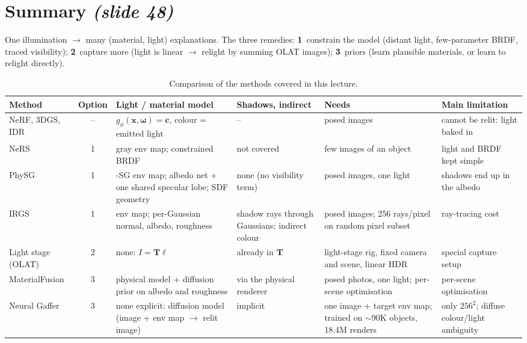 \documentclass[11pt,a4paper]{article}
\theoremstyle{definition}
\theoremstyle{plain}
\theoremstyle{remark}
\newcommand{\slideone}[1]{\texorpdfstring{\emph{(slide #1)}}{(slide #1)}}
\newcommand{\x}{{\bm{x}}}
\newcommand{\w}{{\bm{\omega}}}
\begin{document}
\section{Summary \slideone{48}}

One illumination $\to$ many (material, light) explanations. The three remedies:
\textbf{1}~constrain the model (distant light, few-parameter BRDF, traced visibility); \textbf{2}~capture more (light is linear $\to$ relight by summing OLAT images); \textbf{3}~priors (learn plausible materials, or learn to relight directly).

\begin{table}[!htbp]
\centering\small
\renewcommand{\arraystretch}{1.25}
\begin{tabularx}{\textwidth}{>{\raggedright\arraybackslash}p{2.3cm}c>{\raggedright\arraybackslash}X>{\raggedright\arraybackslash}X>{\raggedright\arraybackslash}X>{\raggedright\arraybackslash}X}
\toprule
\textbf{Method} & \textbf{Option} & \textbf{Light / material model} & \textbf{Shadows, indirect} & \textbf{Needs} & \textbf{Main limitation}\\
\midrule
NeRF, 3DGS, IDR & -- & $g_\phi(\x,\w)=\bm c$, colour = emitted light & -- & posed images & cannot be relit: light baked in\\
NeRS & 1 & gray env map; constrained BRDF & not covered & few images of an object & light and BRDF kept simple\\
PhySG & 1 & 128-SG env map; albedo net + one shared specular lobe; SDF geometry & none (no visibility term) & posed images, one light & shadows end up in the albedo\\
IRGS & 1 & env map; per-Gaussian normal, albedo, roughness & shadow rays through Gaussians; indirect colour & posed images; 256 rays/pixel on random pixel subset & ray-tracing cost\\
Light stage (OLAT) & 2 & none: $I=\bm T\bm\ell$ & already in $\bm T$ & light-stage rig, fixed camera and scene, linear HDR & special capture setup\\
MaterialFusion & 3 & physical model + diffusion prior on albedo and roughness & via the physical renderer & posed photos, one light; per-scene optimisation & per-scene optimisation\\
Neural Gaffer & 3 & none explicit: diffusion model (image + env map $\to$ relit image) & implicit & one image + target env map; trained on ${\sim}$90K objects, 18.4M renders & only $256^2$; diffuse colour/light ambiguity\\
\bottomrule
\end{tabularx}
\caption{Comparison of the methods covered in this lecture.}
\end{table}
\end{document}

